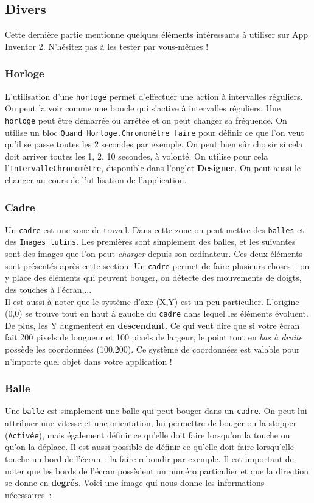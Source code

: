 \documentclass[12t,a4paper]{article}
\begin{document}
\subsection{Divers}
Cette dernière partie mentionne quelques éléments intéressants à utiliser sur App Inventor 2. N'hésitez pas à les tester par vous-mêmes !
\subsubsection{Horloge}
L'utilisation d'une \texttt{horloge} permet d'effectuer une action à intervalles réguliers. On peut la voir comme une boucle qui s'active à intervalles réguliers. Une \texttt{horloge} peut être démarrée ou arrêtée et on peut changer sa fréquence. On utilise un bloc \texttt{Quand Horloge.Chronomètre faire} pour définir ce que l'on veut qu'il se passe toutes les 2 secondes par exemple. On peut bien sûr choisir si cela doit arriver toutes les 1, 2, 10 secondes, à volonté. On utilise pour cela l'\texttt{IntervalleChronomètre}, disponible dans l'onglet \textbf{Designer}. On peut aussi le changer au cours de l'utilisation de l'application.

\subsubsection{Cadre}
Un \texttt{cadre} est une zone de travail. Dans cette zone on peut mettre des \texttt{balles} et des \texttt{Images lutins}. Les premières sont simplement des balles, et les suivantes sont des images que l'on peut \textit{charger} depuis son ordinateur. Ces deux éléments sont présentés après cette section. Un \texttt{cadre} permet de faire plusieurs choses~: on y place des éléments qui peuvent bouger, on détecte des mouvements de doigts, des touches à l'écran,... \\

Il est aussi à noter que le système d'axe (X,Y) est un peu particulier. L'origine (0,0) se trouve tout en haut à gauche du \texttt{cadre} dans lequel les éléments évoluent. De plus, les Y augmentent en \textbf{descendant}. Ce qui veut dire que si votre écran fait 200 pixels de longueur et 100 pixels de largeur, le point tout en \textit{bas à droite} possède les coordonnées (100,200). Ce système de coordonnées est valable pour n'importe quel objet dans votre application !

\subsubsection{Balle}
Une \texttt{balle} est simplement une balle qui peut bouger dans un \texttt{cadre}. On peut lui attribuer une vitesse et une orientation, lui permettre de bouger ou la stopper (\texttt{Activée}), mais également définir ce qu'elle doit faire lorsqu'on la touche ou qu'on la déplace. Il est aussi possible de définir ce qu'elle doit faire lorsqu'elle touche un bord de l'écran~: la faire rebondir par exemple. Il est important de noter que les bords de l'écran possèdent un numéro particulier et que la direction se donne en \textbf{degrés}. Voici une image qui nous donne les informations nécessaires~:
\end{document}
